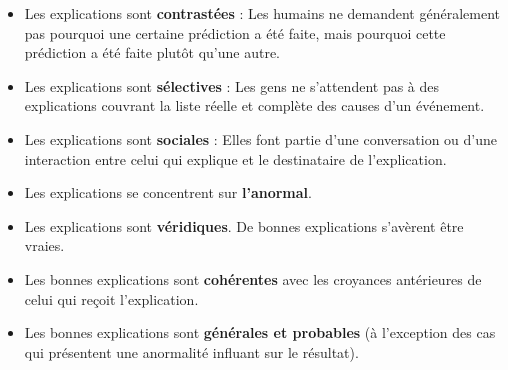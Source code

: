 \begin{itemize}
   \item Les explications sont \textbf{contrastées} : Les humains ne demandent généralement pas pourquoi une certaine prédiction a été faite, mais pourquoi cette prédiction a été faite plutôt qu'une autre.
   \item Les explications sont \textbf{sélectives} : Les gens ne s'attendent pas à des explications couvrant la liste réelle et complète des causes d'un événement.
   \item Les explications sont \textbf{sociales} : Elles font partie d'une conversation ou d'une interaction entre celui qui explique et le destinataire de l'explication.
   \item Les explications se concentrent sur \textbf{l'anormal}.
   \item Les explications sont \textbf{véridiques}. De bonnes explications s'avèrent être vraies.
   \item Les bonnes explications sont \textbf{cohérentes} avec les croyances antérieures de celui qui reçoit l'explication.
   \item Les bonnes explications sont \textbf{générales et probables} (à l'exception des cas qui présentent une anormalité influant sur le résultat).
\end{itemize}